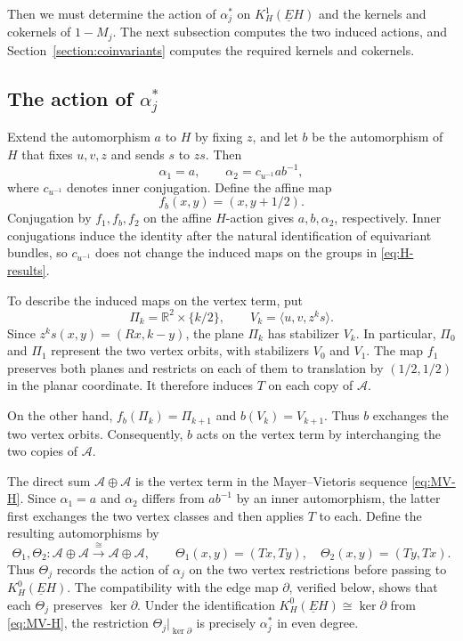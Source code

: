 \documentclass[11pt]{amsart}
\newcommand{\R}{\mathbb R}
\newcommand{\KC}[2]{K^{#1}_{#2}(\underline E#2)}
\theoremstyle{remark}
\numberwithin{equation}{section}
\begin{document}
Then we must determine the action of $\alpha_j^*$ on $\KC{1}{H}$ and the kernels and cokernels of $1-M_j$. The next subsection computes the two induced actions, and Section~\ref{section:coinvariants} computes the required kernels and cokernels.

\subsection{The action of \texorpdfstring{$\alpha_j^*$}{alpha j}}

Extend the automorphism $a$ to $H$ by fixing $z$, and let $b$ be the automorphism of $H$ that fixes $u,v,z$ and sends $s$ to $zs$. Then
\[
 \alpha_1=a,\qquad \alpha_2=c_{u^{-1}}ab^{-1},
\]
where $c_{u^{-1}}$ denotes inner conjugation. Define the affine map
\[
 f_b(x,y)=(x,y+1/2).
\]
Conjugation by $f_1,f_b,f_2$ on the affine $H$-action gives $a,b,\alpha_2$, respectively. Inner conjugations induce the identity after the natural identification of equivariant bundles, so $c_{u^{-1}}$ does not change the induced maps on the groups in \eqref{eq:H-results}.

To describe the induced maps on the vertex term, put
\[
 \Pi_k=\R^2\times\{k/2\},\qquad
 V_k=\langle u,v,z^ks\rangle.
\]
Since $z^ks(x,y)=(Rx,k-y)$, the plane $\Pi_k$ has stabilizer $V_k$. In particular, $\Pi_0$ and $\Pi_1$ represent the two vertex orbits, with stabilizers $V_0$ and $V_1$. The map $f_1$ preserves both
planes and restricts on each of them to translation by
$(1/2,1/2)$ in the planar coordinate. It therefore induces $T$ on
each copy of $\mathcal A$.

On the other hand, $f_b(\Pi_k)=\Pi_{k+1}$ and $b(V_k)=V_{k+1}$. Thus $b$ exchanges the two vertex orbits.  Consequently, $b$ acts on the vertex term by interchanging the two copies of $\mathcal A$.

The direct sum $\mathcal A\oplus\mathcal A$ is the vertex term in the Mayer--Vietoris sequence \eqref{eq:MV-H}. Since $\alpha_1=a$ and $\alpha_2$ differs from $ab^{-1}$ by an inner automorphism, the latter first exchanges the two vertex classes and then applies $T$ to each. Define the resulting automorphisms by
\begin{equation}\label{eq:vertex-maps}
 \Theta_1,\Theta_2\colon\mathcal A\oplus\mathcal A
 \xrightarrow{\cong}\mathcal A\oplus\mathcal A,
 \qquad
 \Theta_1(x,y)=(Tx,Ty),\quad
 \Theta_2(x,y)=(Ty,Tx).
\end{equation}
Thus $\Theta_j$ records the action of $\alpha_j$ on the two vertex restrictions before passing to $K_H^0(\underline EH)$. The compatibility with the edge map $\partial$, verified below, shows that each $\Theta_j$ preserves $\ker\partial$. Under the identification $K_H^0(\underline EH)\cong\ker\partial$ from \eqref{eq:MV-H}, the restriction $\Theta_j|_{\ker\partial}$ is precisely $\alpha_j^*$ in even degree.
\end{document}
